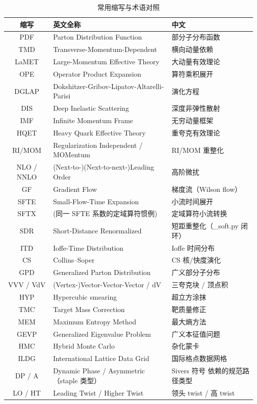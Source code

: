 \documentclass[11pt,a4paper]{ctexart}
\begin{document}
\begin{table}[htbp]
\centering
\caption{常用缩写与术语对照}
\small
\begin{tabular}{c l l}
\toprule
\textbf{缩写} & \textbf{英文全称} & \textbf{中文} \\
\midrule
PDF & Parton Distribution Function & 部分子分布函数 \\
TMD & Transverse-Momentum-Dependent & 横向动量依赖 \\
LaMET & Large-Momentum Effective Theory & 大动量有效理论 \\
OPE & Operator Product Expansion & 算符乘积展开 \\
DGLAP & Dokshitzer-Gribov-Lipatov-Altarelli-Parisi & 演化方程 \\
DIS & Deep Inelastic Scattering & 深度非弹性散射 \\
IMF & Infinite Momentum Frame & 无穷动量框架 \\
HQET & Heavy Quark Effective Theory & 重夸克有效理论 \\
RI/MOM & Regularization Independent / MOMentum & RI/MOM 重整化 \\
NLO / NNLO & (Next-to-)(Next-to-next-)Leading Order & 高阶微扰 \\
GF & Gradient Flow & 梯度流（Wilson flow） \\
SFTE & Small-Flow-Time Expansion & 小流时间展开 \\
SFTX & (同一 SFTE 系数的定域算符惯例) & 定域算符小流转换 \\
SDR & Short-Distance Renormalized & 短距重整化（\_soft.py 闭环） \\
ITD & Ioffe-Time Distribution & Ioffe 时间分布 \\
CS & Collins--Soper & CS 核/快度演化 \\
GPD & Generalized Parton Distribution & 广义部分子分布 \\
VVV / VdV & (Vertex-)Vector-Vector-Vector / dV & 三夸克块 / 顶点积 \\
HYP & Hypercubic smearing & 超立方涂抹 \\
TMC & Target Mass Correction & 靶质量修正 \\
MEM & Maximum Entropy Method & 最大熵方法 \\
GEVP & Generalized Eigenvalue Problem & 广义本征值问题 \\
HMC & Hybrid Monte Carlo & 杂化蒙卡 \\
ILDG & International Lattice Data Grid & 国际格点数据网格 \\
DP / A & Dynamic Phase / Asymmetric（staple 类型） & Sivers 符号
依赖的规范路径类型 \\
LO / HT & Leading Twist / Higher Twist & 领头 twist / 高 twist \\
\bottomrule
\end{tabular}
\end{table}
\end{document}
